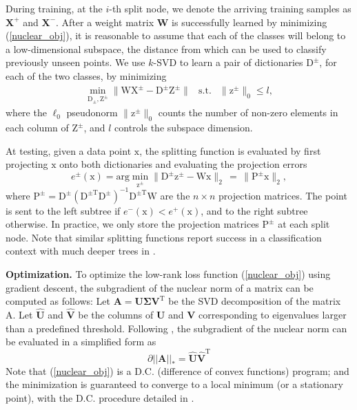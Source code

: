 \documentclass[runningheads]{llncs}
\newcommand{\bb}[1]{\boldsymbol{\mathrm{#1}}}
\newcommand{\Tr}{\mathrm{T}}
\begin{document}
During training, at the $i$-th split node, we denote the arriving training
samples as $\mathbf{X}^+$ and $\mathbf{X}^-$.  After a weight matrix
$\mathbf{W}$ is successfully learned by minimizing (\ref{nuclear_obj}), it is
reasonable to assume that each of the classes will belong to a low-dimensional
subspace, the distance from which can be used to classify previously unseen
points.  We use $k$-SVD \cite{Elad_KSVD} to learn a pair of dictionaries
$\bb{D}^{\pm}$, for each of the two classes, by minimizing
\begin{eqnarray}
\min_{\bb{D}_\pm, \bb{Z}^\pm} \|  \bb{WX}^\pm - \bb{D}^\pm \bb{Z}^\pm \|  & \mathrm{s.t.} & \| \bb{z}^\pm \|_0 \le l,
\end{eqnarray}
where the $\ell_0$ pseudonorm $\| \bb{z}^\pm \|_0$ counts the number of non-zero elements in each column of $\bb{Z}^\pm$, and $l$ controls the subspace dimension.

At testing, given a data point $\bb{x}$, the splitting function is evaluated by first projecting $\bb{x}$ onto both dictionaries and evaluating the projection errors
\begin{equation}
e^\pm(\bb{x}) = \mathrm{arg}\min_{\bb{z}^\pm} \| \bb{D}^\pm \bb{z}^\pm - \bb{Wx} \|_2 \, =\,  \| \bb{P}^\pm \bb{x} \|_2,
\end{equation}
where $\bb{P}^\pm = \bb{D}^\pm (\bb{D}^{\pm \Tr} \bb{D}^\pm)^{-1} \bb{D}^{\pm \Tr} \bb{W}$ are the $n \times n$ projection matrices. The point is sent to the left subtree if $e^-(\bb{x}) < e^+(\bb{x})$, and to the right subtree otherwise. In practice, we only store the projection matrices $\bb{P}^\pm$ at each split node.
Note that similar splitting functions report success in a classification context with much deeper trees in \cite{qiu2013learning}.

\textbf{Optimization.}  To optimize the low-rank loss function
(\ref{nuclear_obj}) using gradient descent, the subgradient of the nuclear norm
of a matrix can be computed as follows: Let $\mathbf{A}=\mathbf{U \Sigma
  V}^\mathrm{T}$ be the SVD decomposition of the matrix A. Let
$\mathbf{\hat{U}}$ and $\mathbf{\hat{V}}$ be the columns of $\mathbf{U}$ and
$\mathbf{V}$ corresponding to eigenvalues larger than a predefined threshold.
Following \cite{lowrankT,subdifferential}, the subgradient of the nuclear norm
can be evaluated in a simplified form as
\[
\partial||\mathbf{A}||_* = \mathbf{\hat{U}} \mathbf{\hat{V}} ^\mathrm{T}
\]
Note that (\ref{nuclear_obj}) is a D.C. (difference of convex functions)
program; and the minimization is guaranteed to converge to a local minimum (or a
stationary point), with the D.C. procedure detailed in \cite{dc2,dc1}.
\end{document}
